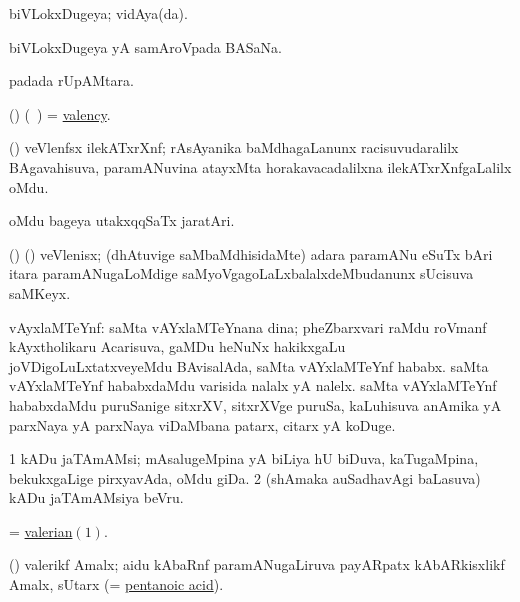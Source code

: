 \bentry 
{} 
\gl{\gu}
\expl{}
\bmng
 biVLokxDugeya; vidAya(da). 
\emng
\eentry

\bentry
{} 
\gl{\nA}
\bmng
 biVLokxDugeya yA samAroVpada BASaNa. 
\emng
\eentry

\bentry
{} 
\gl{\nA}
\expl{}
\bmng
  padada rUpAMtara. 
\emng
\eentry

\bentry
{} 
\gl{\nA}
\expl{}
\bmng
 (\ravi) (\kanmu\ \ame) = \hyperlink{valency}{valency}. 
\emng
\eentry

\bentry 
{}
\gl{\nA}
\expl{}
\bmng
 (\ravi) veVlenfsx ilekATxrXnf; rAsAyanika baMdhagaLanunx racisuvudaralilx BAgavahisuva, paramANuvina atayxMta horakavacadalilxna ilekATxrXnfgaLalilx oMdu. 
\emng
\eentry

\bentry
{} 
\gl{\nA}
\expl{}
\bmng
oMdu bageya utakxqqSaTx jaratAri. 
\emng
\eentry

\bentry
{} 
\gl{\nA}
\bmng
 (\birx) (\ravi) veVlenisx; (dhAtuvige saMbaMdhisidaMte) adara paramANu eSuTx bAri itara paramANugaLoMdige saMyoVgagoLaLxbalalxdeMbudanunx sUcisuva saMKeyx. 
\emng
\eentry

\bentry
{} 
\gl{\nA}
\expl{}
\bmng
 vAyxlaMTeYnf: 
\banum
{} saMta vAYxlaMTeYnana dina; pheZbarxvari raMdu roVmanf kAyxtholikaru Acarisuva, gaMDu heNuNx hakikxgaLu joVDigoLuLxtatxveyeMdu BAvisalAda, saMta vAYxlaMTeYnf hababx. 
 saMta vAYxlaMTeYnf hababxdaMdu varisida nalalx yA nalelx. 
 saMta vAYxlaMTeYnf hababxdaMdu puruSanige sitxrXV, sitxrXVge puruSa, kaLuhisuva anAmika yA parxNaya yA parxNaya viDaMbana patarx, citarx yA koDuge. 
\eanum
\emng
\eentry

\bentry
{} 
\gl{\nA}
\expl{}
\bmng
\bnum
\num{1} kADu jaTAmAMsi; mAsalugeMpina yA biLiya hU biDuva, kaTugaMpina, bekukxgaLige pirxyavAda, oMdu giDa. 
\num{2} (shAmaka auSadhavAgi baLasuva) kADu jaTAmAMsiya beVru. 
\enum
\emng

\noindent
\gl{\pagu}
\bmng
{} = \hyperlink{valerian}{valerian\((1)\)}. 
\emng
\eentry


\bentry
{} 
\gl{\nA}
\expl{}
\bmng
 (\ravi) valerikf Amalx; aidu kAbaRnf paramANugaLiruva payARpatx kAbARkisxlikf Amalx, sUtarx  (= \hyperref{kandict_p.pdf}{P}{pentanoic acid}{pentanoic acid}). 
\emng
\eentry

